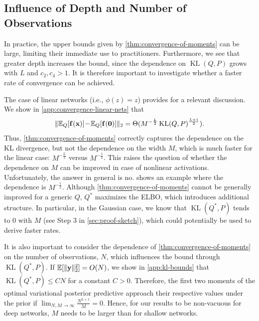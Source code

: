 \documentclass[twoside]{article}
\newcommand{\vnull}{\mathbf{0}}
\newcommand{\vf}{\mathbf{f}}
\newcommand{\vx}{\mathbf{x}}
\newcommand{\vy}{\mathbf{y}}
\newcommand{\E}{\mathbb{E}}
\newcommand{\Q}{\mathbb{Q}}
\renewcommand{\Q}{\ensuremath{Q}}
\newcommand{\KL}{\operatorname{KL}}
\DeclarePairedDelimiter\norm{\|}{\|}             %
\theoremstyle{theoremstyle}
\begin{document}
\subsection{Influence of Depth and Number of Observations}

In practice, the upper bounds given by \cref{thm:convergence-of-moments} can be large, limiting their immediate use to practitioners. Furthermore, we see that greater depth increases the bound, since the dependence on $\KL(Q,P)$ grows with $L$ and $c_2, c_4 >1$. It is therefore important to investigate whether a faster rate of convergence can be achieved. 

The case of linear networks (i.e., $\phi(z) = z$) provides for a relevant discussion. We show in \cref{app:convergence-linear-nets} that
\begin{equation}
    \norm{\E_Q[\vf(\vx)] \!-\! \E_\Q[\vf(\vnull)]}_2
    = \Theta(
        M^{-\frac{L}{2}}
        \KL(Q,P)^{\frac{L+1}{2}}
    ).
\end{equation}
Thus, \cref{thm:convergence-of-moments} correctly captures the dependence on the KL divergence, but not the dependence on the width $M$, which is much faster for the linear case: $M^{-\frac{L}{2}}$ versus $M^{-\frac12}$. This raises the question of whether the dependence on $M$ can be improved in case of nonlinear activations. Unfortunately, the answer in general is no.  shows an example where the dependence is $M^{-\frac12}$.
Although \cref{thm:convergence-of-moments} cannot be generally improved for a generic $Q$, $Q^*$ maximizes the ELBO, which introduces additional structure.
In particular, in the Gaussian case, we know that $\KL(Q^*,P)$ tends to $0$ with $M$ (see Step 3 in \cref{sec:proof-sketch}), which could potentially be used to derive faster rates.
%

It is also important to consider the dependence of \cref{thm:convergence-of-moments} on the number of observations, $N$, which influences the bound through $\KL(Q^*,P)$. If $\E[\norm{\vy}_2^2] = O(N)$, we show in \cref{app:kl-bounds} that $\KL(Q^*,P) \le CN$ for a constant $C>0$. Therefore, the first two moments of the optimal variational posterior predictive approach their respective values under the prior if $\lim_{N,M \to \infty} \frac{N^{L + 1}}{M} = 0$.
Hence, for our results to be non-vacuous for deep networks, $M$ needs to be larger than for shallow networks.
\end{document}
